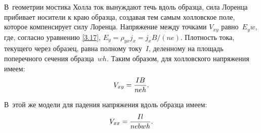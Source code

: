В~геометрии мостика Холла ток вынуждают течь вдоль образца, сила Лоренца
прибивает носители к краю образца, создавая тем самым холловское поле, которое
компенсирует силу Лоренца. Напряжение между точками $V_{xy}$ равно~$E_yw$, где,
согласно уравнению \eqref{3.17}, $E_y=\rho_{yx}j_x=j_x B/(ne)$. Плотность
тока, текущего через образец, равна полному току~$I$, деленному на площадь
поперечного сечения образца~$wh$. Таким образом, для холловского напряжения
имеем:
\begin{equation}
	V_{xy}=\frac{IB}{neh}.
	\eqmark{3.19}
\end{equation}

В~этой же модели для падения напряжения вдоль образца имеем:
\begin{equation}
	V_{xx}=\frac{Il}{nebwh}.
	\eqmark{3.20}
\end{equation}

